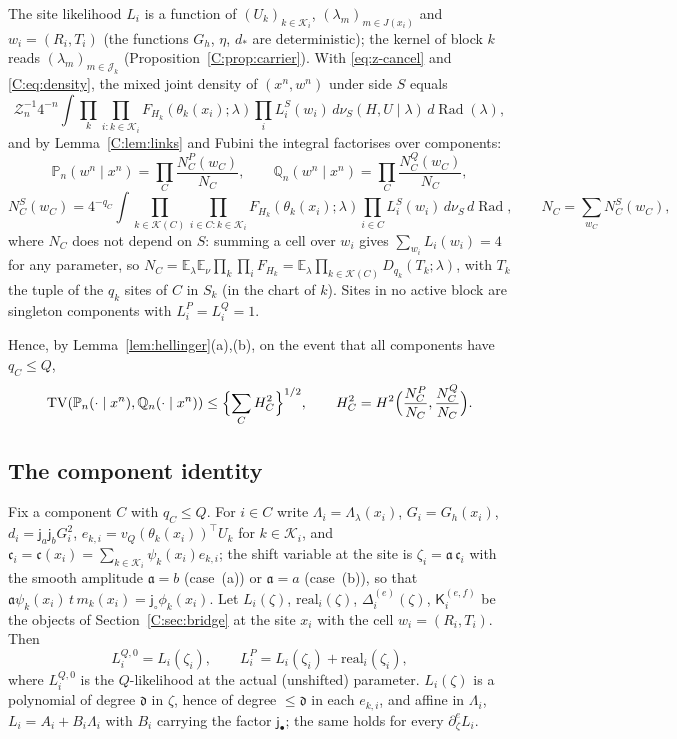 \documentclass[11pt]{article}
\DeclareMathOperator{\Rad}{Rad}
\DeclareMathOperator{\TV}{TV}
\newcommand{\E}{\mathbb{E}}
\newcommand{\PP}{\mathbb{P}}
\newcommand{\cK}{\mathcal{K}}
\newcommand{\cJ}{\mathcal{J}}
\newcommand{\ja}{\mathsf{j}_a}
\newcommand{\jb}{\mathsf{j}_b}
\newcommand{\jsh}{\mathsf{j}_\circ}
\newcommand{\jfi}{\mathsf{j}_\bullet}
\newcommand{\dg}{\mathfrak{d}}
\newcommand{\K}{\mathsf{K}}
\newcommand{\real}{\mathrm{real}}
\newcommand{\cf}{\mathfrak{c}}
\begin{document}
The site likelihood \(L_i\) is a function of \((U_k)_{k\in\cK_i}\),
\((\lambda_m)_{m\in J(x_i)}\) and \(w_i=(R_i,T_i)\) (the functions \(G_h\),
\(\eta\), \(d_*\) are deterministic); the kernel of block \(k\) reads
\((\lambda_m)_{m\in\cJ_k}\) (Proposition~\ref{C:prop:carrier}).  With
\eqref{eq:z-cancel} and \eqref{C:eq:density}, the mixed joint density of
\((x^n,w^n)\) under side \(S\) equals
\[
 \mathcal Z_n^{-1}4^{-n}\int\prod_{k}\prod_{i:k\in\cK_i}F_{H_k}(\theta_k(x_i);\lambda)
 \prod_iL^S_i(w_i)\,d\nu_S(H,U\mid\lambda)\,d\Rad(\lambda),
\]
and by Lemma~\ref{C:lem:links} and Fubini the integral factorises over
components:
\begin{equation}
 \PP_n(w^n\mid x^n)=\prod_C\frac{N^P_C(w_C)}{N_C},\qquad
 \mathbb Q_n(w^n\mid x^n)=\prod_C\frac{N^Q_C(w_C)}{N_C},
 \label{C:eq:factor}
\end{equation}
\[
 N^S_C(w_C)=4^{-q_C}\int\prod_{k\in\cK(C)}\prod_{i\in C:k\in\cK_i}F_{H_k}(\theta_k(x_i);\lambda)
 \prod_{i\in C}L^S_i(w_i)\,d\nu_S\,d\Rad,
 \qquad N_C=\sum_{w_C}N^S_C(w_C),
\]
where \(N_C\) does not depend on \(S\): summing a cell over \(w_i\) gives
\(\sum_{w_i}L_i(w_i)=4\) for any parameter, so
\(N_C=\E_\lambda\E_{\nu}\prod_k\prod_iF_{H_k}=\E_\lambda\prod_{k\in\cK(C)}D_{q_k}(T_k;\lambda)\),
with \(T_k\) the tuple of the \(q_k\) sites of \(C\) in \(S_k\) (in the
chart of \(k\)).  Sites in no active block are singleton components with
\(L^P_i=L^Q_i=1\).

Hence, by Lemma~\ref{lem:hellinger}(a),(b), on the event that all
components have \(q_C\le Q\),
\begin{equation}
 \TV(\PP_n(\cdot\mid x^n),\mathbb Q_n(\cdot\mid x^n))
 \le\Bigl\{\sum_CH^2_C\Bigr\}^{1/2},\qquad
 H^2_C=H^2\Bigl(\frac{N^P_C}{N_C},\frac{N^Q_C}{N_C}\Bigr).
 \label{C:eq:tv-hell}
\end{equation}

\subsection{The component identity}\label{C:sec:component-identity}
Fix a component \(C\) with \(q_C\le Q\).  For \(i\in C\) write
\(\Lambda_i=\Lambda_\lambda(x_i)\), \(G_i=G_h(x_i)\), \(d_i=\ja\jb G_i^2\),
\(e_{k,i}=v_Q(\theta_k(x_i))^\top U_k\) for \(k\in\cK_i\), and
\(\cf_i=\cf(x_i)=\sum_{k\in\cK_i}\psi_k(x_i)e_{k,i}\); the shift variable at
the site is \(\zeta_i=\mathfrak a\,\cf_i\) with the smooth amplitude
\(\mathfrak a=b\) (case~(a)) or \(\mathfrak a=a\) (case~(b)), so that
\(\mathfrak a\psi_k(x_i)\,t\,m_k(x_i)=\jsh\phi_k(x_i)\).  Let \(L_i(\zeta)\),
\(\real_i(\zeta)\), \(\Delta^{(e)}_i(\zeta)\), \(\K_i^{(e,f)}\) be the objects
of Section~\ref{C:sec:bridge} at the site \(x_i\) with the cell
\(w_i=(R_i,T_i)\).  Then
\begin{equation}
 L^{Q,0}_i=L_i(\zeta_i),\qquad L^P_i=L_i(\zeta_i)+\real_i(\zeta_i),
 \label{C:eq:LQ0-LP}
\end{equation}
where \(L^{Q,0}_i\) is the \(Q\)-likelihood at the actual (unshifted)
parameter.  \(L_i(\zeta)\) is a polynomial of degree \(\dg\) in \(\zeta\),
hence of degree \(\le\dg\) in each \(e_{k,i}\), and affine in
\(\Lambda_i\), \(L_i=A_i+B_i\Lambda_i\) with \(B_i\) carrying the factor
\(\jfi\); the same holds for every \(\partial_\zeta^eL_i\).
\end{document}
